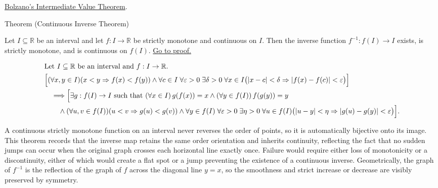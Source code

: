 \begin{remark*}[Dependencies]
\hyperref[thm:bolzano-intermediate-value]{Bolzano's Intermediate Value Theorem}.
\end{remark*}

\begin{theorembox}{Theorem (Continuous Inverse Theorem)}
\begin{theorem}
\label{thm:continuous-inverse-theorem}
Let $I\subseteq\mathbb{R}$ be an interval and let $f:I\to\mathbb{R}$ be strictly monotone and continuous on $I$. Then the inverse function $f^{-1}:f(I)\to I$ exists, is strictly monotone, and is continuous on $f(I)$.
\hyperref[prf:continuous-inverse-theorem]{Go to proof.}
\end{theorem}
\end{theorembox}

\begin{remark*}
\[
\begin{aligned}
&\text{Let } I\subseteq\mathbb{R} \text{ be an interval and } f:I\to\mathbb{R}.\\
&\Bigl[(\forall x,y\in I)(x<y \Rightarrow f(x)<f(y)) \land \forall c\in I\;\forall \varepsilon>0\;\exists \delta>0\;\forall x\in I\bigl(|x-c|<\delta \Rightarrow |f(x)-f(c)|<\varepsilon\bigr)\Bigr]\\
&\quad\Longrightarrow \Bigl[\exists g:f(I)\to I \text{ such that } (\forall x\in I)\, g(f(x))=x \land (\forall y\in f(I))\, f(g(y))=y\\
&\qquad\land (\forall u,v\in f(I))(u<v \Rightarrow g(u)<g(v)) \land \forall y\in f(I)\;\forall \varepsilon>0\;\exists \eta>0\;\forall u\in f(I)\bigl(|u-y|<\eta \Rightarrow |g(u)-g(y)|<\varepsilon\bigr)\Bigr].
\end{aligned}
\]
\end{remark*}

\begin{remark*}[Interpretation]
A continuous strictly monotone function on an interval never reverses the order of points, so it is automatically bijective onto its image. This theorem records that the inverse map retains the same order orientation and inherits continuity, reflecting the fact that no sudden jumps can occur when the original graph crosses each horizontal line exactly once. Failure would require either loss of monotonicity or a discontinuity, either of which would create a flat spot or a jump preventing the existence of a continuous inverse. Geometrically, the graph of $f^{-1}$ is the reflection of the graph of $f$ across the diagonal line $y=x$, so the smoothness and strict increase or decrease are visibly preserved by symmetry.
\end{remark*}

\NoLocalDependencies
